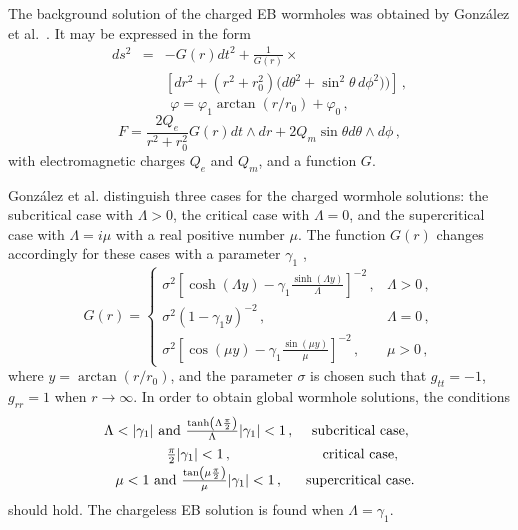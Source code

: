 \documentclass[floats,floatfix,showpacs,amssymb,prd,superscriptaddress,nofootinbib,nolongbibliography,reprint]{revtex4-2}
\begin{document}
The background solution of the charged EB wormholes was obtained by Gonz\'alez et al.~\cite{Gonzalez:2009hn}.
It may be expressed in the form
\begin{eqnarray}
     ds^2 &=&  -G(r) dt^2 
     +{\frac{1}{G(r)}} \times 
     \nonumber \\ &&
    \left[dr^2+(r^2+r_0^2) 
 {   (d\theta^2+ \sin^2{\theta}  \,
    d\phi^2 }
    )) \right] \,,
    \label{eqm}
\end{eqnarray}
\begin{equation}
    \varphi=\varphi_1\arctan{(r/r_0)}+\varphi_0 \, ,
    \label{eqa}
\end{equation}
\begin{equation}
    F=\frac{2Q_e}{r^2+r_0^2}G(r)  dt\wedge dr+2Q_m\sin{\theta}d\theta\wedge d\phi \, ,
    \label{eqp}
\end{equation}
with electromagnetic charges $Q_e$ and $Q_m$, 
and a function $G$.


Gonz\'alez et al.
distinguish three cases for the charged wormhole solutions:
the subcritical case with $\Lambda>0$, the critical case with $\Lambda=0$, and the supercritical case with $\Lambda=i\mu$ with a real positive number $\mu$.
The function $G(r)$ changes accordingly for these cases with a parameter $\gamma_1$
\cite{Gonzalez:2009hn},
\begin{equation}
G(r)
= \left\{
\begin{array}{cc} 
 {\sigma^2} \left[\cosh{(\Lambda y)}-\gamma_1\frac{\sinh{(\Lambda y)}} {\Lambda}\right]^{{-2}}  \, ,
%
& \Lambda > 0 \, ,\\[5pt]
 {\sigma^2} (1-\gamma_1y)^{{-2}} \, ,
%
& \Lambda = 0 \, ,\\[2pt]
{\sigma^2} \left[ \cos(\mu y) - \gamma_1\frac{\sin(\mu y)}{\mu} \right]^{{-2}} \, ,
%
%
& {\mu >0} \, ,
\end{array} 
\right.
\label{cases1}
\end{equation}
where $y=\arctan{(r/r_0)}$, {and the parameter $\sigma$ is chosen {such} that $g_{tt}=-1$, $g_{rr}=1$ when $r {\rightarrow} \infty$}. 
%
%
In order to obtain global wormhole solutions, the conditions 
\begin{equation}
\left.
\begin{array}{cc}
  {\Lambda < |\gamma_1|} \hbox{ and }
  \frac{\tanh\left(\Lambda\frac{\pi}{2}\right)}{\Lambda} |\gamma_1| < 1 \, ,
& \hbox{subcritical case},\\[5pt]
  \frac{\pi}{2}|\gamma_1| < 1 \, ,
& \hbox{critical case},\\[2pt]
  \mu < 1 \hbox{ and }
  \frac{\tan\left(\mu\frac{\pi}{2}\right)}{\mu} |\gamma_1| < 1 \, ,
& \hbox{supercritical case} .
\end{array} 
\right.
\label{cases2}
\end{equation}
should hold.
The chargeless EB solution 
is found when $\Lambda=\gamma_1$.
\end{document}

